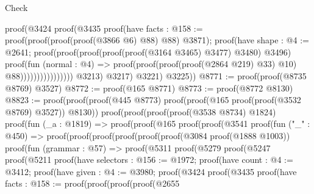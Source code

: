 \begin{lexlean}{Check}
\begin{coremodule}
                                        proof(@3424
                                            proof(@3435
                                                proof(have facts : @158 := proof(proof(proof(proof(@3866
                                                            @6)
                                                          @88)
                                                        @88)
                                                      @3871);
                                                  proof(have shape : @4 := @2641;
                                                    proof(proof(proof(proof(proof(@3164 @3465)
                                                              @3477)
                                                            @3480)
                                                          @3496)
                                                        proof(fun (normal : @4) =>
                                                          proof(proof(proof(proof(@2864 @219) @33)
                                                                @10)
                                                              @88))))))))))))))))
              @3213)
            @3217)
          @3221)
        @3225))
@8771 := proof(proof(@8735 @8769) @3527)
@8772 := proof(@165 @8771)
@8773 := proof(@8772 @8130)
@8823 := proof(proof(proof(@445 @8773) proof(proof(@165 proof(proof(@3532 @8769) @3527)) @8130))
      proof(proof(proof(proof(@3538 @8734) @1824)
            proof(fun (_a : @1819) =>
              proof(proof(@165
                    proof(proof(@3541
                          proof(fun ("_" : @450) =>
                            proof(proof(proof(proof(proof(proof(@3084 proof(@1888 @1003))
                                        proof(fun (grammar : @57) =>
                                          proof(@5311
                                              proof(@5279
                                                  proof(@5247
                                                      proof(@5211
                                                          proof(have selectors : @156 := @1972;
                                                            proof(have count : @4 := @3412;
                                                              proof(have given : @4 := @3980;
                                                                proof(@3424
                                                                    proof(@3435
                                                                        proof(have facts : @158 := proof(proof(proof(proof(@2655

\end{coremodule}
\end{lexlean}
